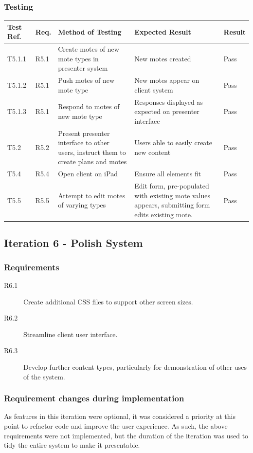 \documentclass[a4papert,11pt,notitlepage]{article}
\begin{document}
\begin{appendices}
\subsubsection{Testing}
\begin{tabular}{p{30pt} | p{25pt} | p{140pt} | p{140pt} || p{90pt}}
Test Ref. & Req. & Method of Testing & Expected Result & Result \\ \hline
T5.1.1 & R5.1 & Create motes of new mote types in presenter system & New motes created & Pass \\
T5.1.2 & R5.1 & Push motes of new mote type & New motes appear on client system & Pass \\
T5.1.3 & R5.1 & Respond to motes of new mote type & Responses displayed as expected on presenter interface & Pass \\
T5.2 & R5.2 & Present presenter interface to other users, instruct them to create plans and motes & Users able to easily create new content & Pass \\
T5.4 & R5.4 & Open client on iPad & Ensure all elements fit & Pass \\
T5.5 & R5.5 & Attempt to edit motes of varying types & Edit form, pre-populated with existing mote values appears, submitting form edits existing mote. & Pass \\
\end{tabular}

\subsection{Iteration 6 - Polish System}
\subsubsection{Requirements}
\begin{description}
\item[R6.1] Create additional CSS files to support other screen sizes.
\item[R6.2] Streamline client user interface.
\item[R6.3] Develop further content types, particularly for demonstration of other uses of the system.
\end{description}

\subsubsection{Requirement changes during implementation}
As features in this iteration were optional, it was considered a priority at this point to refactor code and improve the user experience. As such, the above requirements were not implemented, but the duration of the iteration was used to tidy the entire system to make it presentable.
\end{appendices}
\end{document}
